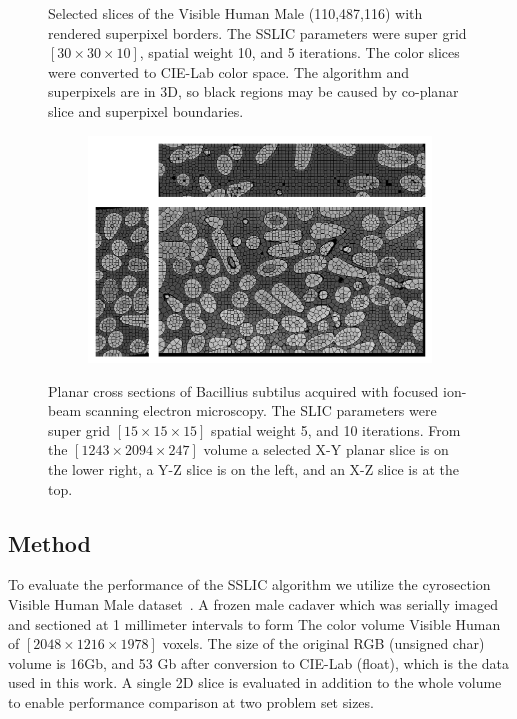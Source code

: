 \documentclass{InsightArticle}
\begin{document}
\begin{figure}
\begin{subfigure}{0.67\textwidth}
  \label{fig:c}
\end{subfigure}
\caption{Selected slices of the Visible Human Male (110,487,116) with rendered superpixel borders. The SSLIC parameters were super grid $[30 \times 30 \times 10]$, spatial weight 10, and 5 iterations. The color slices were converted to CIE-Lab color space. The algorithm and superpixels are in 3D, so black regions may be caused by co-planar slice and superpixel boundaries. }
\label{fig:vh_slices}
\end{figure}


\begin{figure}

\centering
\begin{subfigure}{0.8\textwidth}
  \includegraphics[width=1.0\textwidth]{images/bsub_combined.png}
\end{subfigure}
\caption{Planar cross sections of Bacillius subtilus acquired with focused
	ion-beam scanning electron microscopy. The SLIC parameters were super grid $[15
	\times 15 \times 15]$ spatial weight 5, and 10 iterations. From the $[ 1243
	\times 2094 \times 247]$ volume a selected X-Y planar slice is on the lower
	right, a Y-Z slice is on the left, and an X-Z slice is at the top.}
\label{fig:bsub_3d}
\end{figure}


\subsection{Method}

To evaluate the performance of the SSLIC algorithm we utilize the cyrosection
Visible Human Male dataset~\cite{DBLP:conf/medinfo/Ackerman98}. A frozen male
cadaver which was serially imaged and sectioned at 1 millimeter intervals to
form The color volume  Visible Human of $[2048 \times 1216 \times 1978]$ voxels.
The size of the original RGB (unsigned char) volume is 16Gb, and 53 Gb after
conversion to CIE-Lab (float), which is the data used in this work.
A single 2D slice is evaluated in addition to the whole volume to enable
performance comparison at two problem set sizes.
\end{document}
